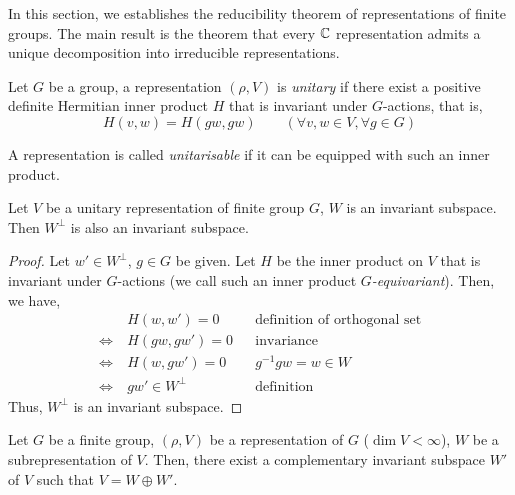 In this section, we establishes the reducibility theorem of representations of
finite groups. The main result is the theorem that every $\operatorname{\mathbb{C}}$ representation
admits a unique decomposition into irreducible representations.

\begin{defn}
  Let $G$ be a group, a representation $(\rho,V)$ is \emph{unitary} if there
  exist a positive definite Hermitian inner product $H$ that is invariant under
  $G$-actions, that is,
  \[
    H(v,w) = H(gw, gw) \qquad (\forall v,w \in V, \forall g \in G)
  \]

  A representation is called \emph{unitarisable} if it can be equipped with such
  an inner product.
\end{defn}

\begin{lem}\label{ortho-inv}
  Let $V$ be a unitary representation of finite group $G$, $W$ is an invariant
  subspace. Then $W^{\perp}$ is also an invariant subspace.
\end{lem}

\begin{proof}
  Let $w' \in W^{\bot}$, $g \in G$ be given.  Let $H$ be the inner product on
  $V$ that is invariant under $G$-actions (we call such an inner product
  \emph{$G$-equivariant}).  Then, we have,
  \begin{align*}
    & H(w,w') = 0 && \text{definition of orthogonal set}\\
    \Leftrightarrow \ & H(gw, gw') = 0 && \text{invariance}\\
    \Leftrightarrow \ & H(w, gw') = 0  && g^{-1}gw = w \in W\\
    \Leftrightarrow \ & gw' \in W^{\bot} && \text{definition}
  \end{align*}
  Thus, $W^{\bot}$ is an invariant subspace.
\end{proof}

\begin{lem}\label{fin-decompose}
  Let $G$ be a finite group, $(\rho, V)$ be a representation of $G$ ($\dim V <
  \infty$), $W$ be a subrepresentation of $V$.  Then, there exist a
  complementary invariant subspace $W'$ of $V$ such that $V = W \oplus W'$.
\end{lem}

